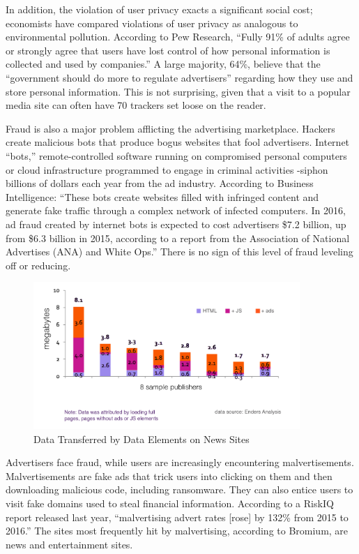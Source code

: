 \documentclass[11pt]{article}
\begin{document}
In addition, the violation of user privacy exacts a significant social cost; economists have compared violations of user privacy as analogous to environmental pollution.\cite{5} According to Pew Research, ``Fully 91\% of adults agree or strongly agree that users have lost control of how personal information is collected and used by companies.''\cite{6} A large majority, 64\%, believe that the ``government should do more to regulate advertisers'' regarding how they use and store personal information. This is not surprising, given that a visit to a popular media site can often have 70 trackers set loose on the reader. 

Fraud is also a major problem afflicting the advertising marketplace. Hackers create malicious bots that produce bogus websites that fool advertisers. Internet ``bots,'' remote-controlled software running on compromised personal computers or cloud infrastructure programmed to engage in criminal activities -siphon billions of dollars each year from the ad industry. According to Business Intelligence: ``These bots create websites filled with infringed content and generate fake traffic through a complex network of infected computers. In 2016, ad fraud created by internet bots is expected to cost advertisers \$7.2 billion, up from \$6.3 billion in 2015, according to a report from the Association of National Advertises (ANA) and White Ops.''\cite{7} There is no sign of this level of fraud leveling off or reducing. 

\begin{figure}
\begin{center}
\includegraphics[width=0.9\textwidth]{data_transfer_news_sites.png}
\caption{Data Transferred by Data Elements on News Sites}
\end{center}
\end{figure}



Advertisers face fraud, while users are increasingly encountering malvertisements. Malvertisements are fake ads that trick users into clicking on them and then downloading malicious code, including ransomware. They can also entice users to visit fake domains used to steal financial information. According to a RiskIQ report released last year, ``malvertising advert rates [rose] by 132\% from 2015 to 2016.'' The sites most frequently hit by malvertising, according to Bromium\cite{8}, are news and entertainment sites. 
\end{document}
